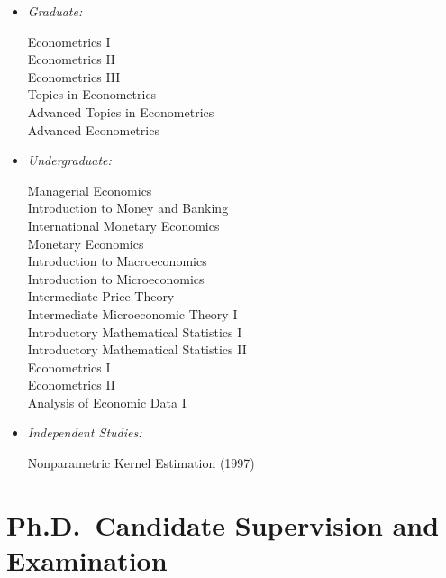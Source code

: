 \documentclass[
]{article}
\begin{document}
\begin{itemize}
\item
  \emph{Graduate:}

  Econometrics I\\
  Econometrics II\\
  Econometrics III\\
  Topics in Econometrics\\
  Advanced Topics in Econometrics\\
  Advanced Econometrics
\item
  \emph{Undergraduate:}

  Managerial Economics\\
  Introduction to Money and Banking\\
  International Monetary Economics\\
  Monetary Economics\\
  Introduction to Macroeconomics\\
  Introduction to Microeconomics\\
  Intermediate Price Theory\\
  Intermediate Microeconomic Theory I\\
  Introductory Mathematical Statistics I\\
  Introductory Mathematical Statistics II\\
  Econometrics I\\
  Econometrics II\\
  Analysis of Economic Data I
\item
  \emph{Independent Studies:}

  Nonparametric Kernel Estimation (1997)\\
\end{itemize}

\section*{Ph.D.~Candidate Supervision and
Examination}\label{ph.d.-candidate-supervision-and-examination}
\end{document}
